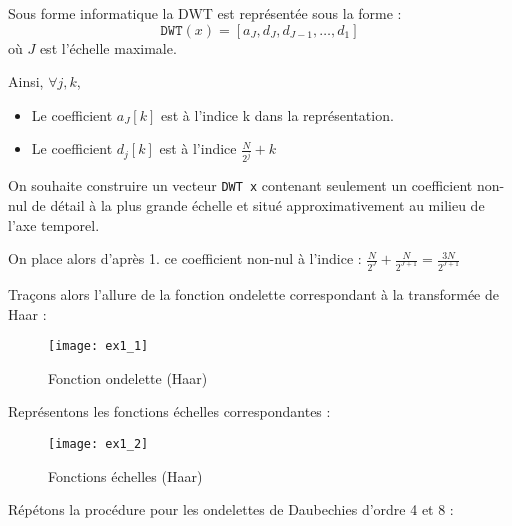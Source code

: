 \documentclass[12pt,a4paper,titlepage]{article}
\begin{document}
\begin{enumerate}

    \item{Sous forme informatique la DWT est représentée sous la forme : 
            $$ \texttt{DWT}(x) = [a_J, d_J, d_{J-1}, \dots, d_1] $$ où $J$ est l'échelle maximale.

            Ainsi, $\forall j, k$,

            \begin{itemize}
                \item{Le coefficient $a_J[k]$ est à l'indice k dans la représentation.}
                \item{Le coefficient $d_j[k]$ est à l'indice $ \frac{N}{2^j} + k  $}
            \end{itemize}
        }

    \item{ On souhaite construire un vecteur \texttt{DWT x} contenant seulement un coefficient non-nul
            de détail à la plus grande échelle et situé approximativement au milieu de l'axe temporel.

            On place alors d'après 1. ce coefficient non-nul à l'indice :
            $ \frac{N}{2^J} + \frac{N}{2^{J+1}} = \frac{3N}{2^{J+1}} $

        \item{Traçons alors l'allure de la fonction ondelette correspondant à la transformée de 
                Haar :

                \begin{figure}[H]
                    \caption{Fonction ondelette (Haar)}
                    \texttt{[image: ex1\_1]}
                    \centering
                \end{figure}
            }

        \item{Représentons les fonctions échelles correspondantes :

                \begin{figure}[H]
                    \caption{Fonctions échelles (Haar)}
                    \texttt{[image: ex1\_2]}
                    \centering
                \end{figure}
            }

        \setcounter{enumi}{5}

        \item{Répétons la procédure pour les ondelettes de Daubechies d'ordre 4 et 8 :

}}
\end{enumerate}
\end{document}
